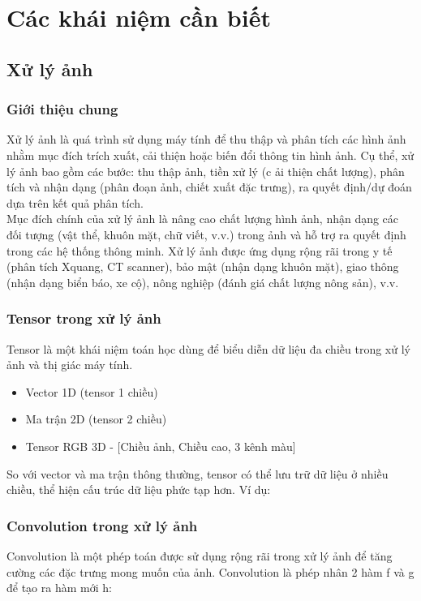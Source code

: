 \section{Các khái niệm cần biết}
\subsection{Xử lý ảnh}
\subsubsection{Giới thiệu chung}
Xử lý ảnh là quá trình sử dụng máy tính để thu thập và phân tích các hình ảnh nhằm mục đích trích xuất, cải thiện hoặc biến đổi thông tin hình ảnh. Cụ thể, xử lý ảnh bao gồm các bước: thu thập ảnh, tiền xử lý (c ải thiện chất lượng), phân tích và nhận dạng (phân đoạn ảnh, chiết xuất đặc trưng), ra quyết định/dự đoán dựa trên kết quả phân tích.\\
\newline
Mục đích chính của xử lý ảnh là nâng cao chất lượng hình ảnh, nhận dạng các đối tượng (vật thể, khuôn mặt, chữ viết, v.v.) trong ảnh và hỗ trợ ra quyết định trong các hệ thống thông minh. Xử lý ảnh được ứng dụng rộng rãi trong y tế (phân tích Xquang, CT scanner), bảo mật (nhận dạng khuôn mặt), giao thông (nhận dạng biển báo, xe cộ), nông nghiệp (đánh giá chất lượng nông sản), v.v.
\subsubsection{Tensor trong xử lý ảnh}
Tensor là một khái niệm toán học dùng để biểu diễn dữ liệu đa chiều trong xử lý ảnh và thị giác máy tính.
\begin{itemize}
\item Vector 1D (tensor 1 chiều)
\item Ma trận 2D (tensor 2 chiều)
\item Tensor RGB 3D - [Chiều ảnh, Chiều cao, 3 kênh màu]
\end{itemize}
\newline
So với vector và ma trận thông thường, tensor có thể lưu trữ dữ liệu ở nhiều chiều, thể hiện cấu trúc dữ liệu phức tạp hơn.
Ví dụ:
%
%
%
%
\subsubsection{Convolution trong xử lý ảnh}
Convolution là một phép toán được sử dụng rộng rãi trong xử lý ảnh để tăng cường các đặc trưng mong muốn của ảnh.
Convolution là phép nhân 2 hàm f và g để tạo ra hàm mới h:

